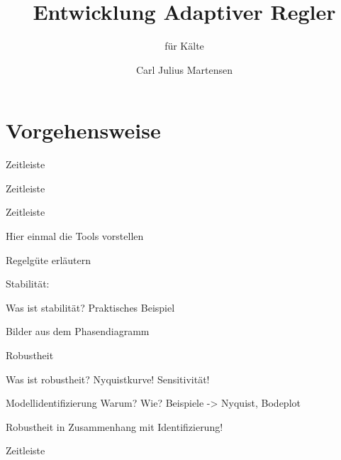 \documentclass[fleqn,11pt,aspectratio=43]{beamer}
\title{Entwicklung Adaptiver Regler}
\subtitle{für Kälte}
\author{Carl Julius Martensen}
\begin{document}
\begin{frame}[plain]
\titlepage
\end{frame}

\section{Vorgehensweise}

\begin{frame}{Zeitleiste}

\begin{figure}

\end{figure}

\end{frame}

\begin{frame}{Zeitleiste}

\begin{figure}

\end{figure}

\end{frame}

\begin{frame}{Zeitleiste}

Hier einmal die Tools vorstellen

\end{frame}

\begin{frame}
Regelgüte erläutern
\end{frame}

\begin{frame}

Stabilität:

Was ist stabilität?
Praktisches Beispiel

Bilder aus dem Phasendiagramm

Robustheit

Was ist robustheit?
Nyquistkurve!
Sensitivität!

\end{frame}

\begin{frame}
Modellidentifizierung
Warum?
Wie?
Beispiele -> Nyquist, Bodeplot
\end{frame}

\begin{frame}
Robustheit in Zusammenhang mit Identifizierung!
\end{frame}

\begin{frame}{Zeitleiste}

\begin{figure}

\end{figure}

\end{frame}
\end{document}
